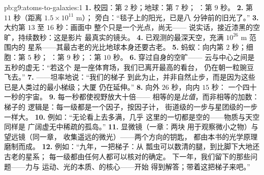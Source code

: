 \begin{solution}{pb:g9:atoms-to-galaxies:1}
\textbf{1.} 校园：第 $2$ 秒；地球：第 $7$ 秒；
：第 $9$ 秒。
\textbf{2.} 第 $11$ 秒（距离 $1.5 \times 10^{11}$ \unit{m}）；
旁白：“毯子上的阳光，已是八
分钟前的旧光了。”
\textbf{3.} 大约第 $13$ 至 $16$ 秒：画面中
整个只是一个光点，尚无——
说实话，接近漆黑的空旷，持续数秒：这是影片
最真实的镜头。
\textbf{4.} 已观测的最深天空，充满 $10^{26}$ \unit{m} 范围内的
星系——其最古老的光比地球本身还要古老。
\textbf{5.} 蚂蚁：向内第 $2$ 秒；细胞：第 $5$ 秒；
：第 $9$ 秒；：第 $10$ 秒。
\textbf{6.} 穿过自身的空旷——
云与中心之间是五秒的虚无：“若这个
是一座体育场，我们已离开最高的看台，
仍在朝一粒豌豆飞去。”
\textbf{7.} ——坦率地说：“我们的梯子
到此为止，并非自然止步，而是因为这些
已是人类过的最小梯级；大厦
仍在延伸。”
\textbf{8.} 向外 $26$ 秒，向内 $15$ 秒：
一个四十一秒的宇宙。
\textbf{9.} 每一秒都使视野放大十倍——
相等的是\emph{比值}，而非相等的加数：梯子的
逻辑是：每一级都是一个因子，按因子计，
街道级的一步与星团级的一步一样大。
\textbf{10.} 例如：“无论看上去多满，几乎
这里的一切都是空的——物质与天空同样是
广阔虚无中稀疏的孤岛。”
\textbf{11.} 显微镜（一章：两块
用于观察微小之物）与望远镜（同一章，
收集遥远的微光）——两个方向的钥匙，
都由本书的光学原理磨制而成。
\textbf{12.} 例如：“九年，一把梯子：从
瓢虫可以数清的腿，到比脚下大地还古老的星系；
每一级都由任何人都可以核对的确定。
下一年，我们留下的那些问题——力与
运动、光的本质、的核心——开始
得到解答；带着这把梯子来吧。”
\end{solution}
